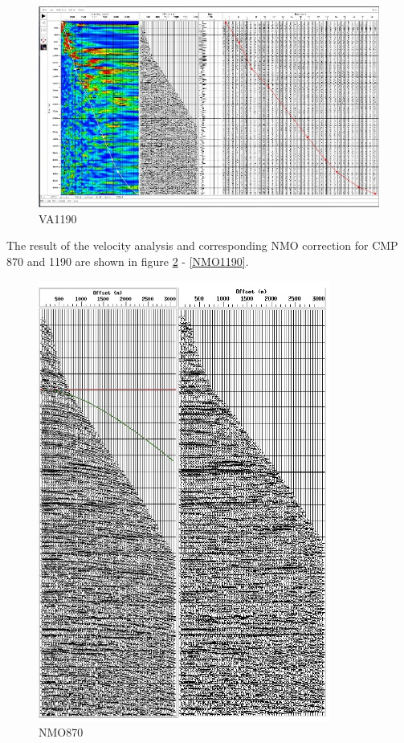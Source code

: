 \documentclass[10pt,a4paper]{article}
\begin{document}
\begin{figure}[H]
\includegraphics[width=\textwidth]{Velo_anal_1190.jpg}
\caption{VA1190}
\label{VA1190}
\end{figure}

\noindent The result of the velocity analysis and corresponding NMO correction for CMP 870 and 1190 are shown in figure \ref{NMO870} - \ref{NMO1190}.

\begin{figure}[H]
\includegraphics[width=\textwidth]{beforeAfter_NMOcorr_870.jpg}
\caption{NMO870}
\label{NMO870}
\end{figure}
\end{document}
